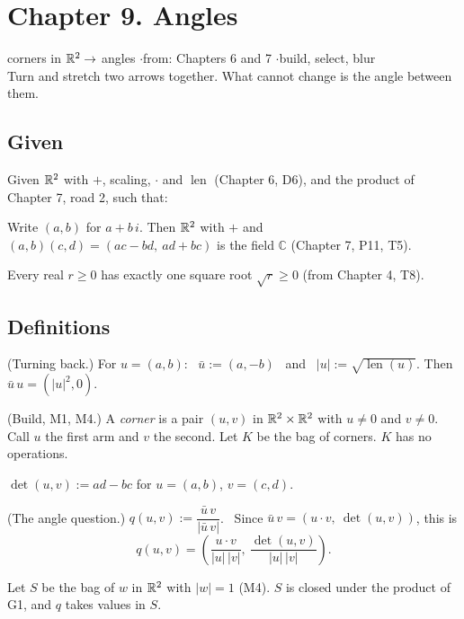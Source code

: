 \newpage

\section*{Chapter 9. Angles}
\begin{center}
{\normalsize corners in $\mathbb{R}^2 \to$ angles \quad$\cdot$\quad from: Chapters 6 and 7 \quad$\cdot$\quad build, select, blur}\\[4pt]
{\small Turn and stretch two arrows together. What cannot change is the angle between them.}
\end{center}

\subsection*{Given}

Given $\mathbb{R}^2$ with $+$, scaling, $\cdot$ and $\operatorname{len}$ (Chapter 6, D6), and the product of Chapter 7, road 2, such that:
\begin{lines}
\item[\lab{G1}] Write $(a, b)$ for $a + b\,i$. Then $\mathbb{R}^2$ with $+$ and $(a,b)(c,d) = (ac - bd,\ ad + bc)$ is the field $\mathbb{C}$ (Chapter 7, P11, T5).
\item[\lab{G2}] Every real $r \ge 0$ has exactly one square root $\sqrt{r} \ge 0$ (from Chapter 4, T8).
\end{lines}

\subsection*{Definitions}

\begin{lines}
\item[\lab{D1}] (Turning back.) For $u = (a, b)$: \ $\bar u := (a, -b)$ \ and \ $|u| := \sqrt{\operatorname{len}(u)}$. Then $\bar u\, u = (|u|^2, 0)$.
\item[\lab{D2}] (Build, M1, M4.) A \emph{corner} is a pair $(u, v)$ in $\mathbb{R}^2 \times \mathbb{R}^2$ with $u \neq 0$ and $v \neq 0$. Call $u$ the first arm and $v$ the second. Let $K$ be the bag of corners. $K$ has no operations.
\item[\lab{D3}] $\det(u, v) := ad - bc$ for $u = (a,b)$, $v = (c,d)$.
\item[\lab{D4}] (The angle question.) $q(u, v) := \dfrac{\bar u\, v}{|\bar u\, v|}$. \ Since $\bar u\, v = (u \cdot v,\ \det(u,v))$, this is
\[
q(u, v) = \left( \frac{u \cdot v}{|u|\,|v|},\ \frac{\det(u, v)}{|u|\,|v|} \right).
\]
\item[\lab{D5}] Let $S$ be the bag of $w$ in $\mathbb{R}^2$ with $|w| = 1$ (M4). $S$ is closed under the product of G1, and $q$ takes values in $S$.
\end{lines}

